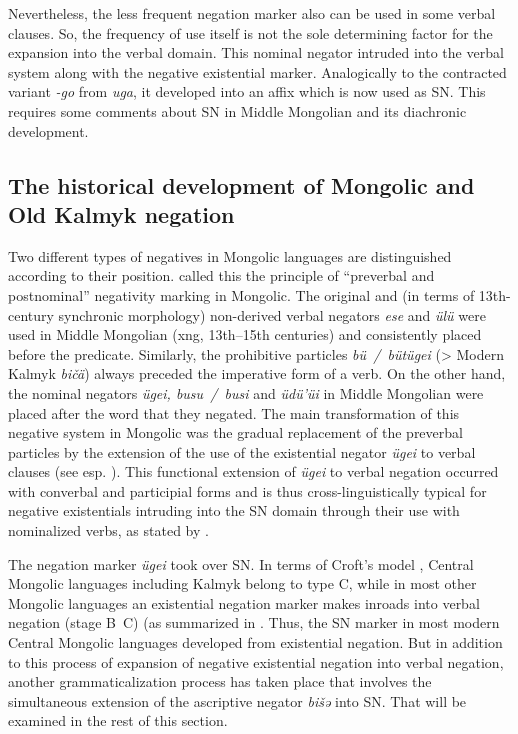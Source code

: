 \documentclass[output=paper,draft,draftmode,colorlinks,citecolor=brown]{langscibook}
\begin{document}
Nevertheless, the less frequent negation marker also can be used in some verbal clauses. So, the frequency of use itself is not the sole determining factor for the expansion into the verbal domain. This nominal negator intruded into the verbal system along with the negative existential marker. Analogically to the contracted variant \textit{-go} from \textit{uga}, it developed into an affix which is now used as SN. This requires some comments about SN in Middle Mongolian and its diachronic development.

\subsection{The historical development of Mongolic and Old Kalmyk negation}\label{sec:BK3.4}

Two different types of negatives in Mongolic languages are distinguished according to their position. \citet[3]{yu1991a} called this the principle of “preverbal and postnominal” negativity marking in Mongolic. The original and (in terms of 13th-century synchronic morphology) non-derived verbal negators \textit{ese} and \textit{ülü} were used in Middle Mongolian (xng, 13th–15th centuries) and consistently placed before the predicate. Similarly, the prohibitive particles \textit{bü / bütügei} (> Modern Kalmyk \textit{bičä}) always preceded the imperative form of a verb. On the other hand, the nominal negators \textit{ügei, busu / busi} and \textit{üdü’üi} in Middle Mongolian were placed after the word that they negated. The main transformation of this negative system in Mongolic was the gradual replacement of the preverbal particles by the extension of the use of the existential negator \textit{ügei} to verbal clauses (see esp. \citealp{yu1991a, brosig2015a}). This functional extension of \textit{ügei} to verbal negation occurred with converbal and participial forms and is thus cross-linguistically typical for negative existentials intruding into the SN domain through their use with nominalized verbs, as stated by \citet[155]{Veselinova2016}.

The negation marker \textit{ügei} took over SN. In terms of Croft’s model \citeyearpar{Croft1991}, Central Mongolic languages including Kalmyk belong to type C, while in most other Mongolic languages an existential negation marker makes inroads into verbal negation (stage B~C) (as summarized in \citealp[128]{brosig2015a}. Thus, the SN marker in most modern Central Mongolic languages developed from existential negation. But in addition to this process of expansion of negative existential negation into verbal negation, another grammaticalization process has taken place that involves the simultaneous extension of the ascriptive negator \textit{bišǝ} into SN. That will be examined in the rest of this section.
\end{document}
